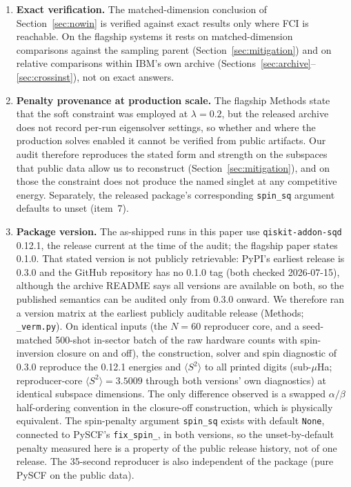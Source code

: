 \documentclass[11pt]{article}
\newcommand{\ssq}{\ensuremath{\langle S^2\rangle}}
\begin{document}
\begin{enumerate}
\item \textbf{Exact verification.} The matched-dimension conclusion of Section~\ref{sec:nowin} is verified against exact results only where FCI is reachable. On the flagship systems it rests on matched-dimension comparisons against the sampling parent (Section~\ref{sec:mitigation}) and on relative comparisons within IBM's own archive (Sections~\ref{sec:archive}--\ref{sec:crossinst}), not on exact answers.
\item \textbf{Penalty provenance at production scale.} The flagship Methods state that the soft constraint was employed at $\lambda = 0.2$, but the released archive does not record per-run eigensolver settings, so whether and where the production solves enabled it cannot be verified from public artifacts. Our audit therefore reproduces the stated form and strength on the subspaces that public data allow us to reconstruct (Section~\ref{sec:mitigation}), and on those the constraint does not produce the named singlet at any competitive energy. Separately, the released package's corresponding \texttt{spin\_sq} argument defaults to unset (item~7).
\item \textbf{Package version.} The as-shipped runs in this paper use \texttt{qiskit-addon-sqd} 0.12.1, the release current at the time of the audit; the flagship paper states 0.1.0. That stated version is not publicly retrievable: PyPI's earliest release is 0.3.0 and the GitHub repository has no 0.1.0 tag (both checked 2026-07-15), although the archive README says all versions are available on both, so the published semantics can be audited only from 0.3.0 onward. We therefore ran a version matrix at the earliest publicly auditable release (Methods; \texttt{\_verm.py}). On identical inputs (the $N=60$ reproducer core, and a seed-matched 500-shot in-sector batch of the raw hardware counts with spin-inversion closure on and off), the construction, solver and spin diagnostic of 0.3.0 reproduce the 0.12.1 energies and \ssq{} to all printed digits (sub-$\mu$Ha; reproducer-core $\ssq = 3.5009$ through both versions' own diagnostics) at identical subspace dimensions. The only difference observed is a swapped $\alpha/\beta$ half-ordering convention in the closure-off construction, which is physically equivalent. The spin-penalty argument \texttt{spin\_sq} exists with default \texttt{None}, connected to PySCF's \texttt{fix\_spin\_}, in both versions, so the unset-by-default penalty measured here is a property of the public release history, not of one release. The 35-second reproducer is also independent of the package (pure PySCF on the public data).
\end{enumerate}
\end{document}
